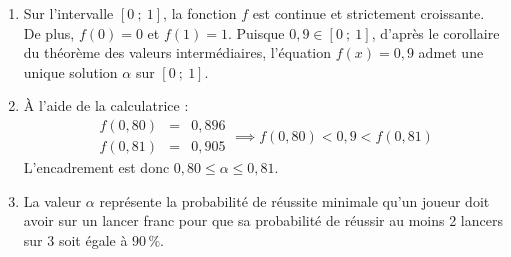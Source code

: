 \documentclass[10pt]{article}
\begin{document}
\begin{enumerate}
\begin{enumerate}
\item Sur l'intervalle $[0~;~1]$, la fonction $f$ est continue et strictement croissante. De plus, $f(0) = 0$ et $f(1) = 1$. Puisque $0,9 \in [0~;~1]$, d'après le corollaire du théorème des valeurs intermédiaires, l'équation $f(x) = 0,9$ admet une unique solution $\alpha$ sur $[0~;~1]$.

\item À l'aide de la calculatrice :
\[
\begin{array}{rcl}
f(0,80) &=& 0,896\\
f(0,81) &=& 0,905
\end{array} \implies f(0,80) < 0,9 < f(0,81)
\]
L'encadrement est donc $0,80 \leqslant \alpha \leqslant 0,81$.

	\item La valeur $\alpha$ représente la probabilité de réussite minimale qu'un joueur doit avoir sur un lancer franc pour que sa probabilité de réussir au moins 2 lancers sur 3 soit égale à $90\,\%$.
	\end{enumerate}
\end{enumerate}
\end{document}
